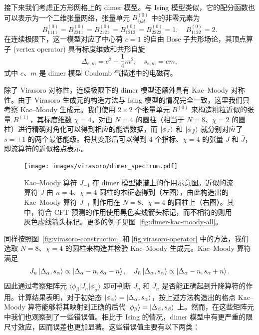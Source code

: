 接下来我们考虑正方形网格上的 dimer 模型\cite{kasteleyn1961statistics,temperley1961dimer,kasteleyn1963dimer}。与 Ising 模型类似，它的配分函数也可以表示为一个二维张量网络，张量单元 $B^{(0)}_{ijkl}$ 中的非零元素为
\begin{equation}
  B^{(0)}_{1111} = B^{(0)}_{2211} = B^{(0)}_{2121} = B^{(0)}_{1212} = B^{(0)}_{2222} = 1, \quad
  B^{(0)}_{1122} = 2.
\end{equation}
在连续极限下，这一模型对应了中心荷 $c=1$ 的自由 Bose 子共形场论\cite{ioffe1989superconductivity,henley1997relaxation,allegra2015exact}，其顶点算子 (vertex operator) 具有标度维数和共形自旋
\begin{equation}
  \Delta_{e,m} = e^2 + \frac14 m^2, \quad
  s_{e,m} = em,
\end{equation}
式中 $e$、$m$ 是 dimer 模型 Coulomb 气描述中的电磁荷。

除了 Virasoro 对称性，连续极限下的 dimer 模型还额外具有 Kac--Moody 对称性。由于 Virasoro 生成元的构造方法与 Ising 模型的情况完全一致，这里我们只考察 Kac--Moody 生成元。我们使用 $2\times2$ 个张量单元 $B^{(0)}$ 来构造粗粒近似的张量 $B^{(1)}$，其标度维数 $\chi=4$。对由 $N=4$ 的圆柱（相当于 $N=8$、$\chi=2$ 的圆柱）进行精确对角化可以得到相应的能谱数据，而 $\ket*{\phi_J}$ 和 $\ket*{\phi_{\bar{J}}}$ 就分别对应了 $s=\pm1$ 的两个最低能级。将其变形后可以得到 4 个指标、$\chi=4$ 的张量 $J$ 和 $\bar{J}$，即流算符的近似格点表示。

\begin{figure}[ht]
  \centering
  \texttt{[image: images/virasoro/dimer\_spectrum.pdf]}
  \caption[Kac--Moody 算符在 dimer 模型能谱上的作用示意图]{Kac--Moody 算符 $J_{-1}$ 在 dimer 模型能谱上的作用示意图。近似的流算符 $J$ 由 $n=4$、$\chi=4$ 圆柱的本征态得到（左图），由此构造出的 Kac--Moody 算符 $J_{-1}$ 则作用在 $N=8$、$\chi=4$ 的圆柱上（右图）。其中，符合 CFT 预测的作用使用黑色实线箭头标记，而不相符的则用灰色虚线箭头标记。更多的例子见图~\ref{fig:dimer-kac-moody-all}。}
  \label{fig:dimer-kac-moody}
\end{figure}

同样按照图~\ref{fig:virasoro-construction} 和 \ref{fig:virasoro-operator} 中的方法，我们选取 $N=8$、$\chi=4$ 的圆柱来构造并检验 Kac--Moody 生成元。Kac--Moody 算符满足
\begin{equation}
  J_n         \ket{\Delta_\alpha, s_\alpha} \propto \ket{\Delta_\alpha-n, s_\alpha-n}, \quad
  J_{\bar{n}} \ket{\Delta_\alpha, s_\alpha} \propto \ket{\Delta_\alpha-n, s_\alpha+n}.
\end{equation}
因此通过考察矩阵元 $\langle\phi_\beta|J_n|\phi_\alpha\rangle$ 即可判断 $J_n$ 和 $\bar{J}_n$ 是否能正确起到升降算符的作用。计算结果表明，对于初始态 $\ket{\phi_\alpha}=\ket{\Delta_\alpha,s_\alpha}$，按上述方法构造出的格点 Kac--Moody 算符能够将其映射到正确的后代 $\ket{\phi_\beta}=\ket{\Delta_\beta,s_\beta}$ 上。然而，在这些矩阵元中我们也观察到了一些错误值。相比于 Ising 的情况，dimer 模型中有更严重的限尺寸效应，因而误差也更加显著。这些错误值主要有以下两类：

